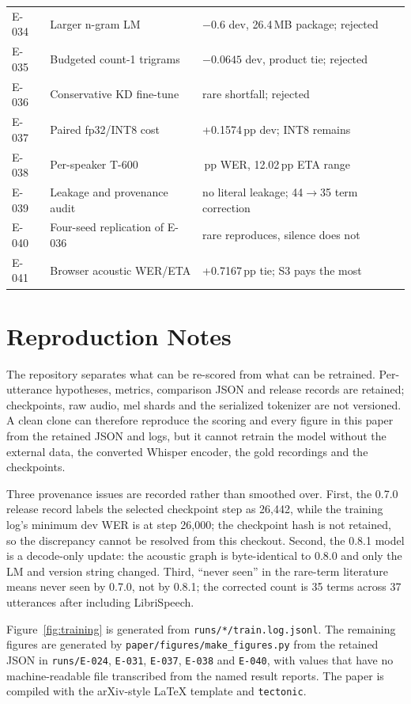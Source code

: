 \documentclass{article}
\begin{document}
\begin{longtable}{@{}p{1.05cm}>{\raggedright\arraybackslash}p{5.0cm}>{\raggedright\arraybackslash}p{8.0cm}@{}}
E-034 & Larger n-gram LM & $-0.6$ dev, 26.4\,MB package; rejected \\
E-035 & Budgeted count-1 trigrams & $-0.0645$ dev, product tie; rejected \\
E-036 & Conservative KD fine-tune & rare shortfall; rejected \\
E-037 & Paired fp32/INT8 cost & +0.1574\,pp dev; INT8 remains \\
E-038 & Per-speaker T-600 & 5.34\,pp WER, 12.02\,pp ETA range \\
E-039 & Leakage and provenance audit & no literal leakage; 44$\to$35 term correction \\
E-040 & Four-seed replication of E-036 & rare reproduces, silence does not \\
E-041 & Browser acoustic WER/ETA & +0.7167\,pp tie; S3 pays the most \\
\end{longtable}

\section{Reproduction Notes}
\label{app:repro}

The repository separates what can be re-scored from what can be retrained. Per-utterance
hypotheses, metrics, comparison JSON and release records are retained; checkpoints, raw audio, mel
shards and the serialized tokenizer are not versioned. A clean clone can therefore reproduce the
scoring and every figure in this paper from the retained JSON and logs, but it cannot retrain the
model without the external data, the converted Whisper encoder, the gold recordings and the
checkpoints.

Three provenance issues are recorded rather than smoothed over. First, the 0.7.0 release record
labels the selected checkpoint step as 26{,}442, while the training log's minimum dev WER is at
step 26{,}000; the checkpoint hash is not retained, so the discrepancy cannot be resolved from
this checkout. Second, the 0.8.1 model is a decode-only update: the acoustic graph is byte-identical
to 0.8.0 and only the LM and version string changed. Third, ``never seen'' in the rare-term
literature means never seen by 0.7.0, not by 0.8.1; the corrected count is 35 terms across 37
utterances after including LibriSpeech.

Figure~\ref{fig:training} is generated from \texttt{runs/*/train.log.jsonl}. The remaining
figures are generated by \texttt{paper/figures/make\_figures.py} from the retained JSON in
\texttt{runs/E-024}, \texttt{E-031}, \texttt{E-037}, \texttt{E-038} and \texttt{E-040}, with
values that have no machine-readable file transcribed from the named result reports. The
paper is compiled with the arXiv-style \LaTeX{} template \citep{arxivstyle} and
\texttt{tectonic}.
\end{document}
